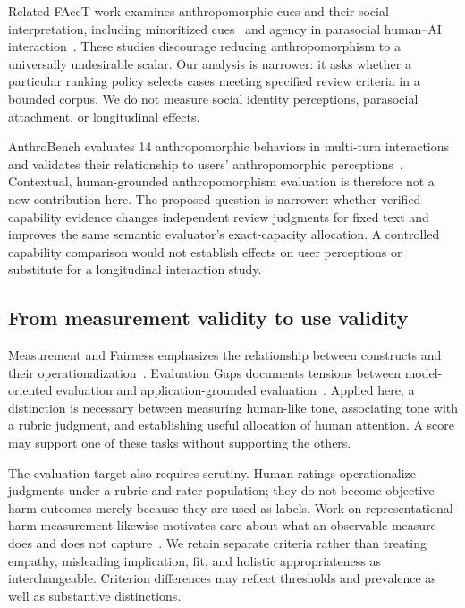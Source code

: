 \documentclass[manuscript,screen,review,anonymous]{acmart}
\begin{document}
Related FAccT work examines anthropomorphic cues and their social interpretation, including minoritized cues~\cite{basoah2025hunty} and agency in parasocial human--AI interaction~\cite{maeda2024parasocial}. These studies discourage reducing anthropomorphism to a universally undesirable scalar. Our analysis is narrower: it asks whether a particular ranking policy selects cases meeting specified review criteria in a bounded corpus. We do not measure social identity perceptions, parasocial attachment, or longitudinal effects.

AnthroBench evaluates 14 anthropomorphic behaviors in multi-turn interactions and validates their relationship to users' anthropomorphic perceptions~\cite{ibrahim2026anthrobench}. Contextual, human-grounded anthropomorphism evaluation is therefore not a new contribution here. The proposed question is narrower: whether verified capability evidence changes independent review judgments for fixed text and improves the same semantic evaluator's exact-capacity allocation. A controlled capability comparison would not establish effects on user perceptions or substitute for a longitudinal interaction study.

\subsection{From measurement validity to use validity}
Measurement and Fairness emphasizes the relationship between constructs and their operationalization~\cite{jacobs2021measurement}. Evaluation Gaps documents tensions between model-oriented evaluation and application-grounded evaluation~\cite{hutchinson2022gaps}. Applied here, a distinction is necessary between measuring human-like tone, associating tone with a rubric judgment, and establishing useful allocation of human attention. A score may support one of these tasks without supporting the others.

The evaluation target also requires scrutiny. Human ratings operationalize judgments under a rubric and rater population; they do not become objective harm outcomes merely because they are used as labels. Work on representational-harm measurement likewise motivates care about what an observable measure does and does not capture~\cite{chien2024beyond}. We retain separate criteria rather than treating empathy, misleading implication, fit, and holistic appropriateness as interchangeable. Criterion differences may reflect thresholds and prevalence as well as substantive distinctions.
\end{document}
